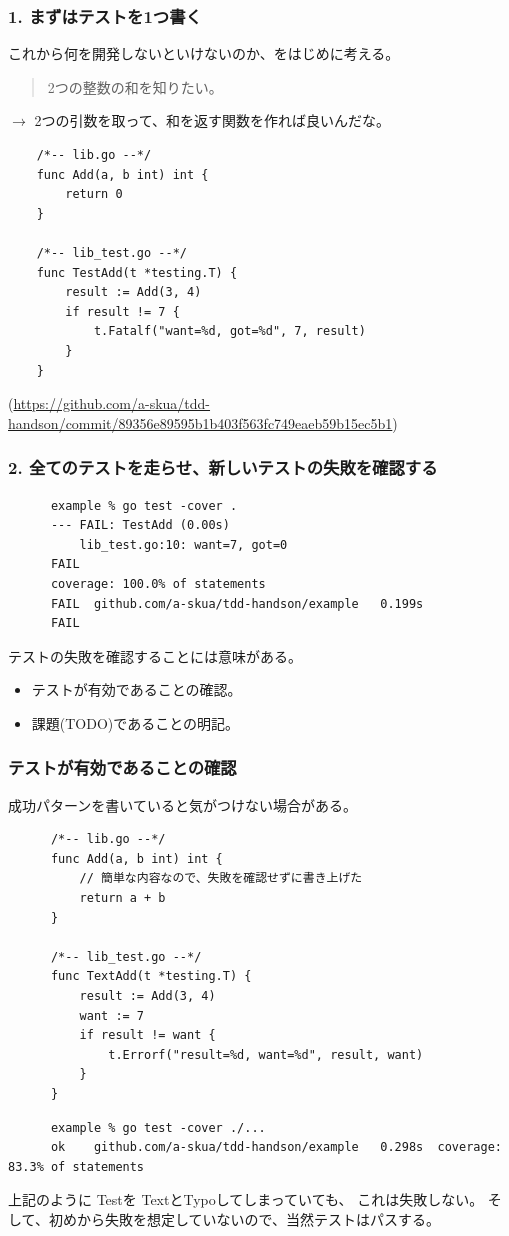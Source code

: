 \documentclass[aspectratio=169]{beamer}
\begin{document}
\begin{frame}[fragile]\frametitle{1. まずはテストを1つ書く}
  これから何を開発しないといけないのか、をはじめに考える。

  \begin{quote}
    \color{blue}
    2つの整数の和を知りたい。
  \end{quote}
  $\rightarrow$ 2つの引数を取って、和を返す関数を作れば良いんだな。

  \scriptsize
  \begin{verbatim}
    /*-- lib.go --*/
    func Add(a, b int) int {
        return 0
    }

    /*-- lib_test.go --*/
    func TestAdd(t *testing.T) {
        result := Add(3, 4)
        if result != 7 {
            t.Fatalf("want=%d, got=%d", 7, result)
        }
    }
  \end{verbatim}

  {\color{gray}(\url{https://github.com/a-skua/tdd-handson/commit/89356e89595b1b403f563fc749eaeb59b15ec5b1})}
\end{frame}

\begin{frame}[fragile]\frametitle{2. 全てのテストを走らせ、新しいテストの失敗を確認する}
  {
    \color{gray}
    \scriptsize
    \begin{verbatim}
      example % go test -cover .
      --- FAIL: TestAdd (0.00s)
          lib_test.go:10: want=7, got=0
      FAIL
      coverage: 100.0% of statements
      FAIL	github.com/a-skua/tdd-handson/example	0.199s
      FAIL
    \end{verbatim}
  }

  テストの失敗を確認することには意味がある。
  \begin{itemize}
    \item {\color{blue} テストが有効であることの確認。}
    \item {\color{blue} 課題(TODO)であることの明記。}
  \end{itemize}
\end{frame}

\begin{frame}[fragile]\frametitle{テストが有効であることの確認}
  成功パターンを書いていると気がつけない場合がある。
  {
    \scriptsize
    \begin{verbatim}
      /*-- lib.go --*/
      func Add(a, b int) int {
          // 簡単な内容なので、失敗を確認せずに書き上げた
          return a + b
      }

      /*-- lib_test.go --*/
      func TextAdd(t *testing.T) {
          result := Add(3, 4)
          want := 7
          if result != want {
              t.Errorf("result=%d, want=%d", result, want)
          }
      }
    \end{verbatim}
  }
  {
    \scriptsize
    \color{gray}
    \begin{verbatim}
      example % go test -cover ./...
      ok  	github.com/a-skua/tdd-handson/example	0.298s	coverage: 83.3% of statements
    \end{verbatim}
  }
  上記のように{\color{blue} Test}を{\color{red} Text}とTypoしてしまっていても、
  これは失敗しない。
  そして、初めから失敗を想定していないので、当然テストはパスする。
\end{frame}
\end{document}
